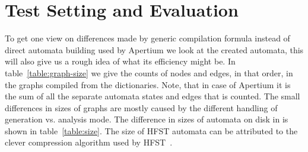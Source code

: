 \documentclass[10pt,a4paper]{article}
\begin{document}
\section{Test Setting and Evaluation}
\label{sec:evaluation}

%

To get one view on differences made by generic compilation formula instead of
direct automata building used by Apertium we look at the created automata, this
will also give us a rough idea of what its efficiency might be. In
table~\ref{table:graph-size} we give the counts of nodes and edges, in that
order, in the graphs compiled from the dictionaries. Note, that in case
of Apertium it is the sum of all the separate automata states and edges that
is counted. The small differences in sizes of graphs are mostly caused by
the different handling of generation vs. analysis mode. The difference in sizes
of automata on disk in is shown in table~\ref{table:size}.
The size of HFST automata can be attributed to the clever compression
algorithm used by HFST~\cite{silfverberg/2009/fsmnlp}.
\end{document}
